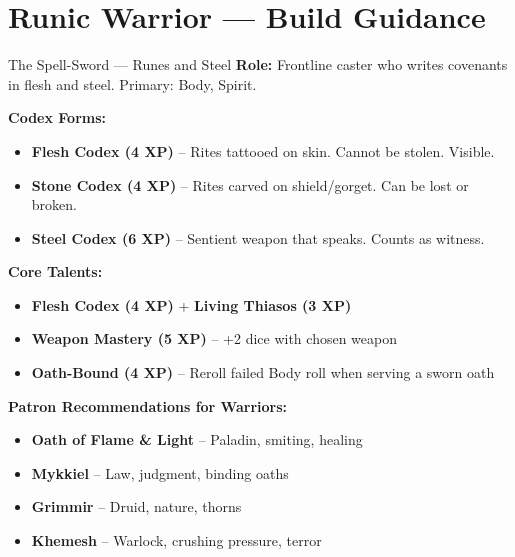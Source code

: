 \documentclass[10pt]{article}
\begin{document}
\begin{Form}
\begin{center}
    \vspace{0.3em}
    \PushButton[name=calcBtnRunekeeper, onclick={this.calculateRunekeeper();}, borderwidth=1pt, bordercolor=blue, backgroundcolor=sectionbg, color=white, width=4cm, height=0.6cm]{\textbf{\textcolor{white}{Calculate Totals}}}
    \quad
    \PushButton[name=resetBtnRunekeeper, onclick={this.resetForm();}, borderwidth=1pt, bordercolor=red!60, backgroundcolor=red!40, color=white, width=4cm, height=0.6cm]{\textbf{\textcolor{white}{Reset Form}}}
\end{center}

\end{Form}
\newpage


\section*{Runic Warrior --- Build Guidance}

\begin{tipbox}{The Spell-Sword --- Runes and Steel}
    \textbf{Role:} Frontline caster who writes covenants in flesh and steel. Primary: Body, Spirit.
    
    \textbf{Codex Forms:}
    \begin{itemize}
        \item \textbf{Flesh Codex (4 XP)} -- Rites tattooed on skin. Cannot be stolen. Visible.
        \item \textbf{Stone Codex (4 XP)} -- Rites carved on shield/gorget. Can be lost or broken.
        \item \textbf{Steel Codex (6 XP)} -- Sentient weapon that speaks. Counts as witness.
    \end{itemize}
    
    \textbf{Core Talents:}
    \begin{itemize}
        \item \textbf{Flesh Codex (4 XP)} + \textbf{Living Thiasos (3 XP)}
        \item \textbf{Weapon Mastery (5 XP)} -- +2 dice with chosen weapon
        \item \textbf{Oath-Bound (4 XP)} -- Reroll failed Body roll when serving a sworn oath
    \end{itemize}
    
    \textbf{Patron Recommendations for Warriors:}
    \begin{itemize}
        \item \textbf{Oath of Flame \& Light} -- Paladin, smiting, healing
        \item \textbf{Mykkiel} -- Law, judgment, binding oaths
        \item \textbf{Grimmir} -- Druid, nature, thorns
        \item \textbf{Khemesh} -- Warlock, crushing pressure, terror
    \end{itemize}
\end{tipbox}
\end{document}
